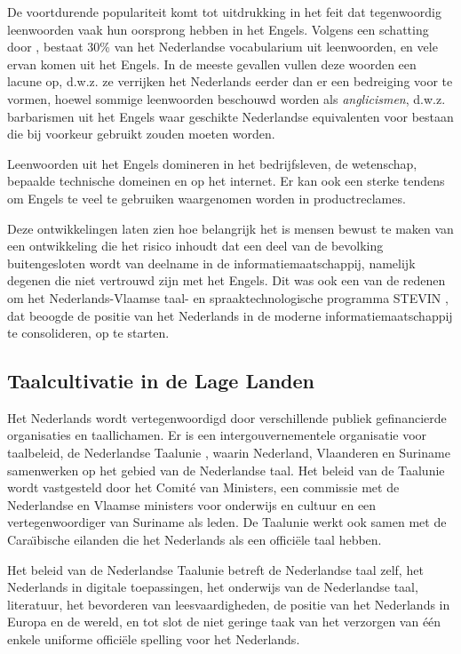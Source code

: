 \begin{multicols}{2}
    De voortdurende populariteit komt tot uitdrukking in het feit dat tegenwoordig leenwoorden vaak hun oorsprong hebben in het Engels. Volgens een schatting door \cite{VanderSijs:2005}, bestaat 30\% van het Nederlandse vocabularium uit leenwoorden, en vele ervan komen uit het Engels. In de meeste gevallen vullen deze woorden een lacune op, d.w.z. ze verrijken het Nederlands eerder dan er een bedreiging voor te vormen, hoewel sommige leenwoorden beschouwd worden als \emph{anglicismen}, d.w.z. barbarismen uit het Engels waar geschikte Nederlandse equivalenten voor bestaan die bij voorkeur gebruikt zouden moeten worden.

    Leenwoorden uit het Engels domineren in het bedrijfsleven, de wetenschap, bepaalde technische domeinen en op het internet. Er kan ook een sterke tendens om Engels te veel te gebruiken waargenomen worden in productreclames.

    Deze ontwikkelingen laten zien hoe belangrijk het is mensen bewust te maken van een ontwikkeling die het risico inhoudt dat een deel van de bevolking buitengesloten wordt van deelname in de informatiemaatschappij, namelijk degenen die niet vertrouwd zijn met het Engels. Dit was ook een van de redenen om het Nederlands-Vlaamse taal- en spraaktechnologische programma STEVIN \cite{STEVIN}, dat beoogde de positie van het Nederlands in de moderne informatiemaatschappij te consolideren, op te starten.

\subsection{Taalcultivatie in de Lage Landen}

   Het Nederlands wordt vertegenwoordigd door verschillende publiek gefinancierde organisaties en taallichamen. Er is een intergouvernementele organisatie voor taalbeleid, de Nederlandse Taalunie \cite{NTU}, waarin Nederland, Vlaanderen en Suriname samenwerken op het gebied van de Nederlandse taal. Het beleid van de Taalunie wordt vastgesteld door het Comit{\'e} van Ministers, een commissie met de Nederlandse en Vlaamse ministers voor onderwijs en cultuur en een vertegenwoordiger van Suriname als leden. De Taalunie werkt ook samen met de Cara{\"\i}bische eilanden die het Nederlands als een offici{\"e}le taal hebben.

   Het beleid van de Nederlandse Taalunie betreft de Nederlandse taal zelf, het Nederlands in digitale toepassingen, het onderwijs van de Nederlandse taal, literatuur, het bevorderen van leesvaardigheden, de positie van het Nederlands in Europa en de wereld, en tot slot de niet geringe taak van het verzorgen van {\'e}{\'e}n enkele uniforme offici{\"e}le spelling voor het Nederlands.


\end{multicols}
